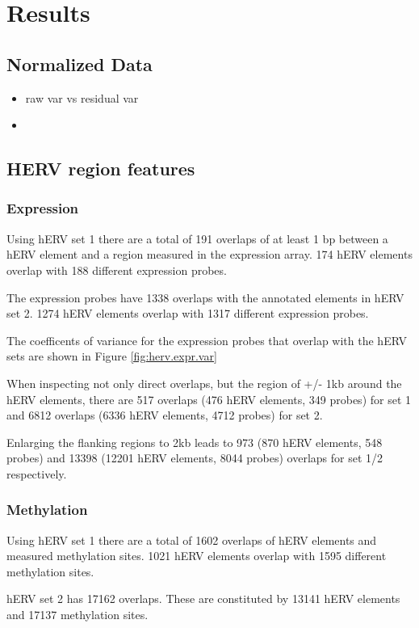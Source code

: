 \documentclass[a4paper,12pt]{article}
\begin{document}
\newpage
\section{Results}
\subsection{Normalized Data}
\begin{itemize}
\item raw var vs residual var
\item 
\end{itemize}
\subsection{HERV region features}
\subsubsection{Expression}
Using hERV set 1 there are a total of 191 overlaps of at least 1 bp between a hERV element and a region measured in the expression array. 174 hERV elements overlap with 188 different expression probes. 

The expression probes have 1338 overlaps with the annotated elements in hERV set 2. 1274 hERV elements overlap with 1317 different expression probes.

The coefficents of variance for the expression probes that overlap with the hERV sets are shown in Figure \ref{fig:herv.expr.var}

When inspecting not only direct overlaps, but the region of +/- 1kb around the hERV elements, there are 517 overlaps (476 hERV elements, 349 probes) for set 1 and 6812 overlaps (6336 hERV elements, 4712 probes) for set 2.

Enlarging the flanking regions to 2kb leads to 973 (870 hERV elements, 548 probes) and 13398 (12201 hERV elements, 8044 probes) overlaps for set 1/2 respectively.



\subsubsection{Methylation}
Using hERV set 1 there are a total of 1602 overlaps of hERV elements and measured methylation sites. 1021 hERV elements overlap with 1595 different methylation sites.

hERV set 2 has 17162 overlaps. These are constituted by 13141 hERV elements and 17137 methylation sites.
\end{document}
